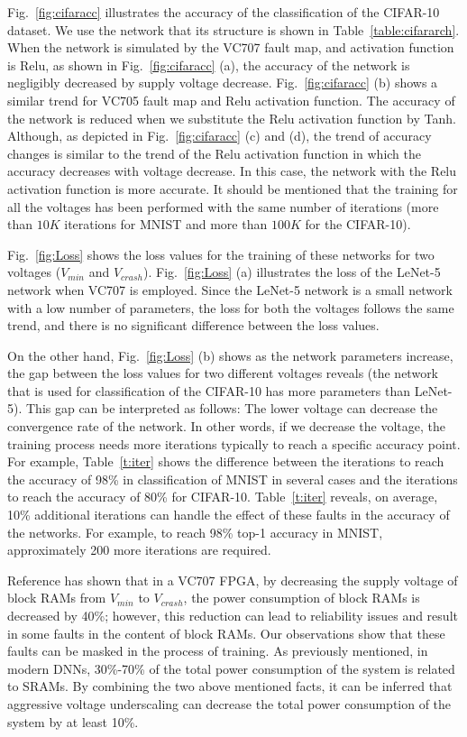 \documentclass[conference]{IEEEtran}
\begin{document}
Fig.~\ref{fig:cifaracc} illustrates the accuracy of the classification of the CIFAR-10 dataset. We use the network that its structure is shown in Table~\ref{table:cifararch}. \color{black} When the network is simulated by the VC707 fault map, and activation function is Relu, as shown in Fig.~\ref{fig:cifaracc} (a), the accuracy of the network is negligibly decreased by supply voltage decrease. Fig.~\ref{fig:cifaracc} (b) shows a similar trend for VC705 fault map and Relu activation function. The accuracy of the network is reduced when we substitute the Relu activation function by Tanh. Although, as depicted in Fig.~\ref{fig:cifaracc} (c) and (d), the trend of accuracy changes is similar to the trend of the Relu activation function in which the accuracy decreases with voltage decrease. In this case, the network with the Relu activation function is more accurate. It should be mentioned that the training for all the voltages has been performed with the same number of iterations (more than $10K$ iterations for MNIST and more than $100K$ for the CIFAR-10). 

Fig.~\ref{fig:Loss} shows the loss values for the training of these networks for two voltages ($V_{min}$ and $V_{crash}$). Fig.~\ref{fig:Loss} (a) illustrates the loss of the LeNet-5 network when VC707 is employed. Since the LeNet-5 network is a small network with a low number of parameters, the loss for both the voltages follows the same trend, and there is no significant difference between the loss values.

On the other hand, Fig.~\ref{fig:Loss} (b) shows as the network parameters increase, the gap between the loss values for two different voltages reveals (the network that is used for classification of the CIFAR-10 has more parameters than LeNet-5). This gap can be interpreted as follows: The lower voltage can decrease the convergence rate of the network. In other words, if we decrease the voltage, the training process needs more iterations typically to reach a specific accuracy point. For example, Table~\ref{t:iter} shows the difference between the iterations to reach the accuracy of 98\% in classification of MNIST in several cases and the iterations to reach the accuracy of 80\% for CIFAR-10.
 Table~\ref{t:iter} reveals, on average, 10\% additional iterations can handle the effect of these faults in the accuracy of the networks. For example, to reach 98\% top-1 accuracy in MNIST, approximately 200 more iterations are required.
 
 Reference \cite{salami2018comprehensive} has shown that in a VC707 FPGA, by decreasing the supply voltage of block RAMs from $V_{min}$ to $V_{crash}$, the power consumption of block RAMs is decreased by 40\%; however, this reduction can lead to reliability issues and result in some faults in the content of block RAMs. Our observations show that these faults can be masked in the process of training. As previously mentioned, in modern DNNs, 30\%-70\% of the total power consumption of the system is related to SRAMs. By combining the two above mentioned facts, it can be inferred that aggressive voltage underscaling can decrease the total power consumption of the system by at least 10\%.
\color{black}
\end{document}
